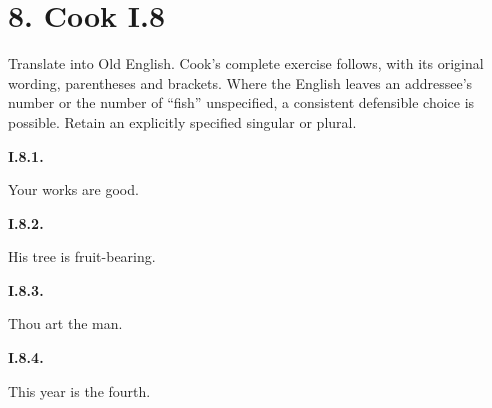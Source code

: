 \section*{8. Cook I.8}

Translate into Old English. Cook’s complete exercise follows, with its original wording, parentheses and brackets. Where the English leaves an addressee’s number or the number of “fish” unspecified, a consistent defensible choice is possible. Retain an explicitly specified singular or plural.

\par\begin{minipage}{\linewidth}\raggedright
\textbf{I.8.1.}

Your works are good.

\end{minipage}\par\addvspace{4pt}

\par\begin{minipage}{\linewidth}\raggedright
\textbf{I.8.2.}

His tree is fruit-bearing.

\end{minipage}\par\addvspace{4pt}

\par\begin{minipage}{\linewidth}\raggedright
\textbf{I.8.3.}

Thou art the man.

\end{minipage}\par\addvspace{4pt}

\par\begin{minipage}{\linewidth}\raggedright
\textbf{I.8.4.}

This year is the fourth.

\end{minipage}\par\addvspace{4pt}

